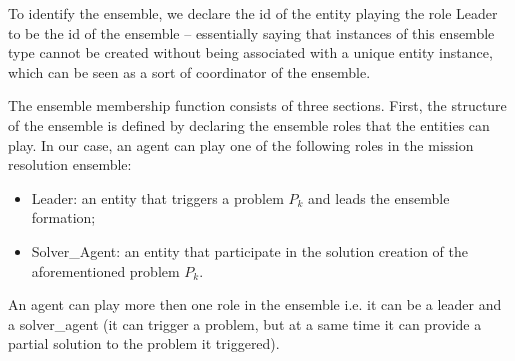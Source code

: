\documentclass[journal]{IEEEtran}
\theoremstyle{definition}
\begin{document}


To identify the ensemble, we declare the id of the entity playing the role Leader to be the id of the ensemble – essentially
saying that instances of this ensemble type cannot be
created without being associated with a unique entity
instance, which can be seen as a sort of coordinator
of the ensemble.

The ensemble membership function 
consists of three sections. First, the
structure of the ensemble is defined by declaring the ensemble
roles that the entities can play.
In our case, an agent can play one of the following roles in the mission resolution ensemble:
\begin{itemize}
\item Leader: an entity that triggers a problem $P_k$ and leads the ensemble formation;
\item Solver\_Agent: an entity that participate in the solution creation of the aforementioned problem $P_k$.
\end{itemize}
An agent can play more then one role in the ensemble i.e. it can be a leader and a solver\_agent (it can trigger a problem, but at a same time it can provide a partial solution to the problem it triggered).
\end{document}
